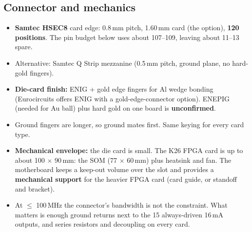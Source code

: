 \documentclass[10pt,a4paper]{article}
\begin{document}
\subsection{Connector and mechanics}
\begin{itemize}
\item \textbf{Samtec HSEC8} card edge: 0.8\,mm pitch, 1.60\,mm card (the  option), \textbf{120 positions}. The pin budget below uses about 107--109, leaving about 11--13 spare.
\item Alternative: Samtec Q Strip mezzanine (0.5\,mm pitch, ground plane, no hard-gold fingers).
\item \textbf{Die-card finish:} ENIG + gold edge fingers for Al wedge bonding (Eurocircuits offers ENIG with a gold-edge-connector option). ENEPIG (needed for Au ball) plus hard gold on one board is \textbf{unconfirmed}.
\item Ground fingers are longer, so ground mates first. Same keying for every card type.
\item \textbf{Mechanical envelope:} the die card is small. The K26 FPGA card is up to about 100 $\times$ 90\,mm: the SOM (77 $\times$ 60\,mm) plus heatsink and fan. The motherboard keeps a keep-out volume over the slot and provides a \textbf{mechanical support} for the heavier FPGA card (card guide, or standoff and bracket).
\item At $\le$ 100\,MHz the connector's bandwidth is not the constraint. What matters is enough ground returns next to the 15 always-driven 16\,mA outputs, and series resistors and decoupling on every card.
\end{itemize}
\end{document}
